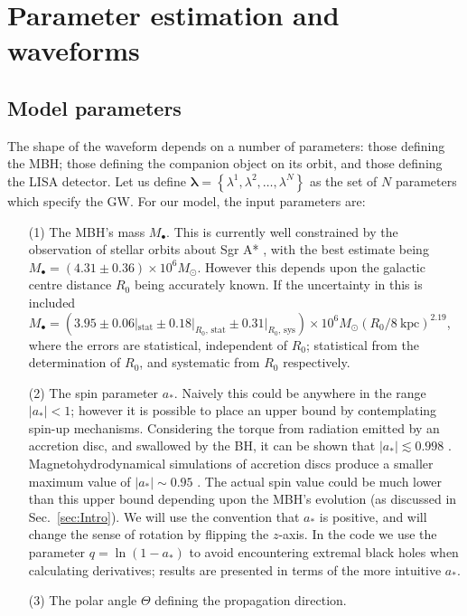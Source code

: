 \documentclass[useAMS,usedcolumn,usegraphicx,usenatbib]{mn2e}
\newcommand{\secref}[1]{Sec.~\ref{sec:#1}}
\newcommand{\units}[1]{\ensuremath{~\mathrm{#1}}}
\newcommand{\sub}[1]{\ensuremath{_\mathrm{#1}}}
\begin{document}
\section{Parameter estimation and waveforms}\label{sec:Parameters}

\subsection{Model parameters}

The shape of the waveform depends on a number of parameters: those defining the MBH; those defining the companion object on its orbit, and those defining the LISA detector. Let us define $\boldsymbol{\lambda} = \left\{\lambda^1, \lambda^2, \ldots, \lambda^N\right\}$ as the set of $N$ parameters which specify the GW. For our model, the input parameters are:
\begin{enumerate}
\item[(1)] The MBH's mass $M_\bullet$. This is currently well constrained by the observation of stellar orbits about Sgr A* \citep{Ghez2008, Gillessen2009}, with the best estimate being $M_\bullet = (4.31 \pm 0.36) \times 10^6 M_\odot$. However this depends upon the galactic centre distance $R_0$ being accurately known. If the uncertainty in this is included $M_\bullet = (3.95 \pm 0.06|\sub{stat} \pm 0.18|_{R_0, \, \mathrm{stat}} \pm  0.31|_{R_0, \, \mathrm{sys}}) \times 10^6 M_\odot (R_0 / 8\units{kpc})^{2.19}$, where the errors are statistical, independent of $R_0$; statistical from the determination of $R_0$, and systematic from $R_0$ respectively.
\item[(2)] The spin parameter $a_\ast$. Naively this could be anywhere in the range $|a_\ast| < 1$; however it is possible to place an upper bound by contemplating spin-up mechanisms. Considering the torque from radiation emitted by an accretion disc, and swallowed by the BH, it can be shown that $|a_\ast| \lesssim 0.998$ \citep{Thorne1974}. Magnetohydrodynamical simulations of accretion discs produce a smaller maximum value of $|a_\ast| \sim 0.95$ \citep{Gammie2004}. The actual spin value could be much lower than this upper bound depending upon the MBH's evolution (as discussed in \secref{Intro}). We will use the convention that $a_\ast$ is positive, and will change the sense of rotation by flipping the $z$-axis. In the code we use the parameter $q = \ln(1 - a_\ast)$ to avoid encountering extremal black holes when calculating derivatives; results are presented in terms of the more intuitive $a_\ast$.
\item[(3)] The polar angle $\Theta$ defining the propagation direction.

\end{enumerate}
\end{document}
